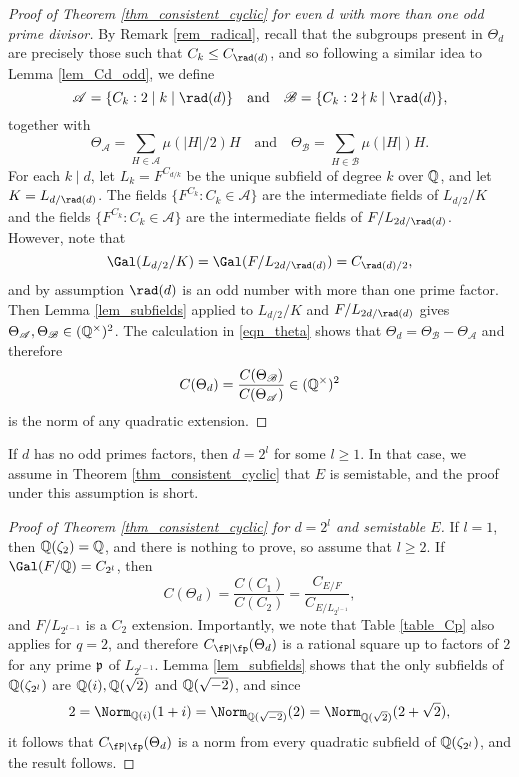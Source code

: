 \begin{proof}[Proof of Theorem \ref{thm_consistent_cyclic} for even $d$ with more than one odd prime divisor]
    By Remark \ref{rem_radical}, recall that the subgroups present in $\Theta_d$ are precisely those such that $C_k\leq C_{\rad(d)}$, and so following a similar idea to Lemma \ref{lem_Cd_odd}, we define
    $$\mathcal{A}=\{C_k :2\mid k\mid\rad(d)\}\quad\text{and}\quad\mathcal{B}=\{C_k:2\nmid k\mid\rad(d)\},$$
    together with
    $$\Theta_\mathcal{A}=\sum_{H\in\mathcal{A}}\mu(|H|/2)H\quad\text{and}\quad\Theta_\mathcal{B}=\sum_{H\in\mathcal{B}}\mu(|H|)H. $$ 
    For each $k\mid d$, let $L_k=F^{C_{d/k}}$ be the unique subfield of degree $k$ over $\mathbb{Q}$, and let $K=L_{d/\rad(d)}$. The fields $\{F^{C_k}:C_k\in\mathcal{A}\}$ are the intermediate fields of $L_{d/2}/K$ and the fields $\{F^{C_k}:C_k\in\mathcal{A}\}$ are the intermediate fields of $F/L_{2d/\rad(d)}$. However, note that 
    $$\Gal(L_{d/2}/K)=\Gal(F/L_{2d/\rad(d)})=C_{\rad(d)/2},$$
    and by assumption $\rad(d)$ is an odd number with more than one prime factor. Then Lemma \ref{lem_subfields} applied to $L_{d/2}/K$ and $F/L_{2d/\rad(d)}$ gives $\Theta_\mathcal{A},\Theta_\mathcal{B}\in(\mathbb{Q}^{\times})^2$. The calculation in \eqref{eqn_theta} shows that $\Theta_d=\Theta_\mathcal{B}-\Theta_\mathcal{A}$ and therefore 
    $$C(\Theta_d)=\frac{C(\Theta_\mathcal{B})}{C(\Theta_\mathcal{A})}\in(\mathbb{Q}^{\times})^2$$
    is the norm of any quadratic extension.

\end{proof}

If $d$ has no odd primes factors, then $d=2^l$ for some $l\geq1$. In that case, we assume in Theorem \ref{thm_consistent_cyclic} that $E$ is semistable, and the proof under this assumption is short. 

\begin{proof}[Proof of Theorem \ref{thm_consistent_cyclic} for $d=2^l$ and semistable $E$]

    If $l=1$, then $\mathbb{Q}(\zeta_2)=\mathbb{Q}$, and there is nothing to prove, so assume that $l\geq2$. If $\Gal(F/\QQ)=C_{2^l}$, then 
    $$C(\Theta_d)=\frac{C(C_1)}{C(C_2)}=\frac{C_{E/F}}{C_{E/L_{2^{l-1}}}},$$
    and $F/L_{2^{l-1}}$ is a $C_2$ extension. Importantly, we note that Table \ref{table_Cp} also applies for $q=2$, and therefore $\Cp(\Theta_d)$ is a rational square up to factors of $2$ for any prime $\mathfrak{p}$ of $L_{2^{l-1}}$. Lemma \ref{lem_subfields} shows that the only subfields of $\mathbb{Q}(\zeta_{2^l})$ are $\mathbb{Q}(i),\mathbb{Q}(\sqrt{2})$ and $\mathbb{Q}(\sqrt{-2})$, and since
    $$2=\Norm_{\QQ(i)}(1+i)=\Norm_{\QQ(\sqrt{-2})}(2)=\Norm_{\QQ(\sqrt{2})}(2+\sqrt{2}),$$
    it follows that $\Cp(\Theta_d)$ is a norm from every quadratic subfield of $\mathbb{Q}(\zeta_{2^l})$, and the result follows.

\end{proof}

